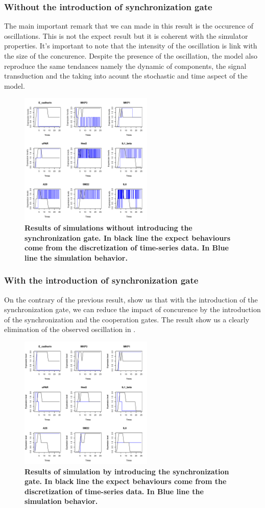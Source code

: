 \subsubsection{Without the introduction of synchronization gate}
The main important remark that we can made in this result  is the occurence of oscillations. This is not the expect result 
but it is coherent with the simulator properties. It's important to note that the intensity of the oscillation is link with 
the size of the concurence. Despite the presence of the oscillation, the model also reproduce the same tendances namely
the dynamic of components, the signal transduction and the taking into acount the stochastic and time aspect of the model.
\begin{figure}[!t]
\centering
\includegraphics[width=2.5in]{images/resultWOS.pdf}
\caption{\bf Results of simulations without introducing the synchronization gate. In black line the expect behaviours
come from the discretization of time-series data. In Blue line the simulation behavior.}
\label{fig:rwos}
\end{figure}
\subsubsection{With the introduction of synchronization gate}
On the contrary of the previous result,  show us that with the introduction of the synchronization gate, we can
reduce the impact of concurence by the introduction of the synchronization and the cooperation gates. The result show us a 
clearly elimination of the observed oscillation in . 

\begin{figure}[!t]
\centering
\includegraphics[width=2.5in]{images/resultWS.pdf}
\caption{\bf Results of simulation by introducing the synchronization gate. In black line the expect behaviours
come from the discretization of time-series data. In Blue line the simulation behavior.}
\label{fig:rws}
\end{figure}


